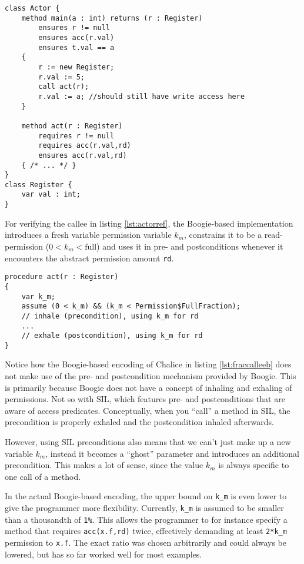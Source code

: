 \begin{lstlisting}[float,label=lst:actorref,caption={A call that uses and preserves fractional read permissions.},language=Chalice]
class Actor {
	method main(a : int) returns (r : Register)
		ensures r != null
		ensures acc(r.val)
		ensures t.val == a
	{
		r := new Register;
		r.val := 5;
		call act(r);
		r.val := a; //should still have write access here
	}

	method act(r : Register)
		requires r != null
		requires acc(r.val,rd)
		ensures acc(r.val,rd)
	{ /* ... */ }
}
class Register {
	var val : int;
}
\end{lstlisting}

For verifying the callee in listing \ref{lst:actorref}, the Boogie-based implementation introduces a fresh variable permission variable $k_m$, constrains it to be a read-permission ($0<k_m<\text{full}$) and uses it in pre- and postconditions whenever it encounters the abstract permission amount \lstinline!rd!. 

\begin{lstlisting}[float,caption={Handling of fractional read permissions by the Boogie-based Chalice verifier.},label=lst:fraccalleeb]
procedure act(r : Register)
{
	var k_m;
	assume (0 < k_m) && (k_m < Permission$FullFraction);
	// inhale (precondition), using k_m for rd
	...
	// exhale (postcondition), using k_m for rd
}
\end{lstlisting}

Notice how the Boogie-based encoding of Chalice in listing \ref{lst:fraccalleeb} does not make use of the pre- and postcondition mechanism provided by Boogie. 
This is primarily because Boogie does not have a concept of inhaling and exhaling of permissions. 
Not so with SIL, which features pre- and postconditions that are aware of access predicates. 
Conceptually, when you ``call'' a method in SIL, the precondition is properly exhaled and the postcondition inhaled afterwards.

However, using SIL preconditions also means that we can't just make up a new variable $k_m$, instead it becomes a ``ghost'' parameter and introduces an additional precondition. This makes a lot of sense, since the value $k_m$ is always specific to one call of a method.

In the actual Boogie-based encoding, the upper bound on \lstinline!k_m! is even lower to give the programmer more flexibility. 
Currently, \lstinline!k_m! is assumed to be smaller than a thousandth of \lstinline[language=Chalice]!1%!.
This allows the programmer to for instance specify a method that requires \lstinline[language=Chalice]!acc(x.f,rd)! twice, effectively demanding at least \lstinline!2*k_m! permission to \lstinline!x.f!.
The exact ratio was chosen arbitrarily and could always be lowered, but has so far worked well for most examples.

